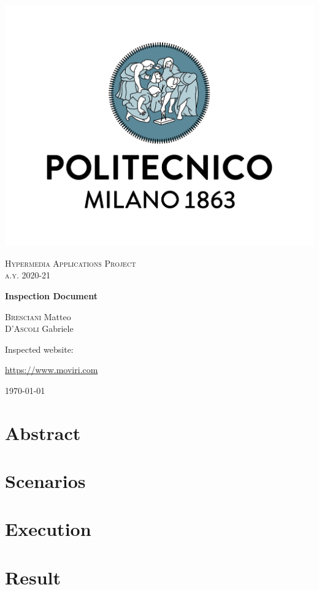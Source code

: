 \documentclass[fontsize=11pt,paper=a4,pagesize=auto]{report}
\begin{document}
\begin{titlepage}
	\centering
	\includegraphics[scale = 0.25]{images/polimi.jpg}\par
	
	{\scshape\Large
		Hypermedia Applications Project\\
		a.y. 2020-21\par}
			\vspace{0.5cm}
	{\huge\bfseries
		Inspection Document\\\par}

	\vspace{1cm}
	{\Large
		{\scshape Bresciani} Matteo\\
		{\scshape D'Ascoli}  Gabriele\par

		}
			\vspace{1cm}

		{\huge\Large
		Inspected website:}\\
					\vspace{0.5cm}

		\huge{\url{https://www.moviri.com}}
		
	
\vspace{0.5cm}
	{\large\today\par}
\end{titlepage}


\tableofcontents
\chapter{Abstract}



\chapter{Scenarios}



\chapter{Execution}





\chapter{Result}

\end{document}
